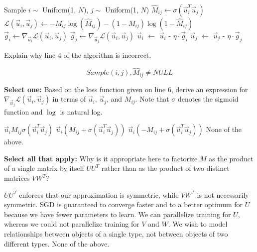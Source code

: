 \documentclass[11pt,addpoints,answers]{exam}
\newcommand{\sall}{\textbf{Select all that apply: }}
\newcommand{\sone}{\textbf{Select one: }}
\begin{document}
\begin{questions}
\begin{parts}
\begin{algorithm}
\begin{algorithmic}[1]
    \State Sample $i \sim$ Uniform(1, $N$), $j \sim$ Uniform(1, $N$)
    \State $\hat{M}_{ij} \gets \sigma(\vec{u}_i^T \vec{u}_j)$ 
    \State $\mathcal{L}(\vec{u}_i, \vec{u}_j) \gets -M_{ij} \log(\hat{M}_{ij}) - (1-M_{ij})\log(1 - \hat{M}_{ij})$
    \State $\vec{g}_i \gets \nabla_{\vec{u}_i} \mathcal{L}(\vec{u}_i, \vec{u}_j)$
    \State $\vec{g}_j \gets \nabla_{\vec{u}_j} \mathcal{L}(\vec{u}_i, \vec{u}_j)$
    \State $\vec{u}_i$ $\gets$ $\vec{u}_i$ - $\eta \cdot \vec{g}_i$
    \State $\vec{u}_j$ $\gets$ $\vec{u}_j$ - $\eta \cdot \vec{g}_j$
\EndWhile
\end{algorithmic}
\end{algorithm}
\newpage
\begin{subparts}
\subpart[1] Explain why line 4 of the algorithm is incorrect.

    \begin{your_solution}[title=Fixed line of code, height=3cm, width=\textwidth]
    $$ Sample (i,j), \hat{M}_{ij}\neq NULL$$

    \end{your_solution}

\subpart[1] \sone Based on the loss function given on line 6, derive an expression for $\nabla_{\vec{u}_j} \mathcal{L}(\vec{u}_i, \vec{u}_j)$ in terms of $\vec{u}_i$, $\vec{u}_j$, and $M_{ij}$. Note that $\sigma$ denotes the sigmoid function and $\log$ is natural log.
    \begin{checkboxes}
    \choice $\vec{u}_i M_{ij} \sigma(\vec{u}_i^T \vec{u}_j)$
    \choice $\vec{u}_i(M_{ij} + \sigma(\vec{u}_i^T \vec{u}_j))$
    \CorrectChoice $\vec{u}_i(-M_{ij} + \sigma(\vec{u}_i^T \vec{u}_j))$
    \choice None of the above.
    \end{checkboxes}
         
    

\subpart[2] \sall Why is it appropriate here to factorize $M$ as the product of a single matrix by itself $U U^T$ rather than as the product of two distinct matrices $VW^T$?
    {\checkboxchar{$\Box$} \checkedchar{$\blacksquare$}
    \begin{checkboxes}
    \CorrectChoice $U U^T$ enforces that our approximation is symmetric, while $VW^T$ is not necessarily symmetric.
    \choice SGD is guaranteed to converge faster and to a better optimum for $U$ because we have fewer parameters to learn.
    \choice We can parallelize training for $U$, whereas we could not parallelize training for $V$ and $W$.
    \CorrectChoice We wish to model relationships between objects of a single type, not between objects of two different types.
    \choice None of the above.
    \end{checkboxes}
    }
    


\end{subparts}
\end{parts}
\end{questions}
\end{document}
